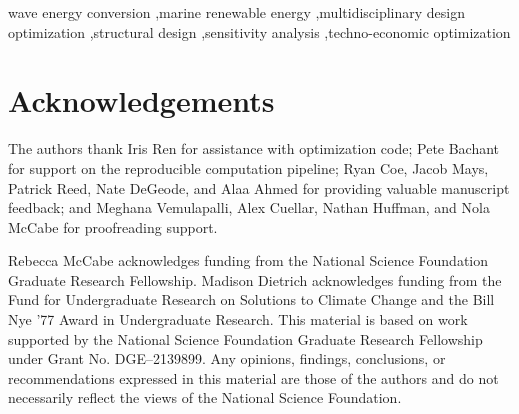 \documentclass[a4paper,fleqn,colorlinks]{cas-dc}
\begin{document}
\begin{highlights}
    
\end{highlights}

\begin{keywords}
wave energy conversion \sep marine renewable energy \sep multidisciplinary design optimization \sep structural design \sep sensitivity analysis  \sep techno-economic optimization



\end{keywords}

\maketitle




\section*{Acknowledgements}
The authors thank Iris Ren for assistance with optimization code;
Pete Bachant for support on the reproducible computation pipeline;
Ryan Coe, Jacob Mays, Patrick Reed, Nate DeGeode, and Alaa Ahmed for providing valuable manuscript feedback;
and Meghana Vemulapalli, Alex Cuellar, Nathan Huffman, and Nola McCabe for proofreading support.

Rebecca McCabe acknowledges funding from the National Science Foundation Graduate Research Fellowship.
Madison Dietrich acknowledges funding from the Fund for Undergraduate Research on Solutions to Climate Change and the Bill Nye '77 Award in Undergraduate Research.
This material is based on work supported by the National Science Foundation Graduate Research Fellowship under Grant No.
DGE–2139899.
Any opinions, findings, conclusions, or recommendations expressed in this material are those of the authors and do not necessarily reflect the views of the National Science Foundation.
\end{document}
